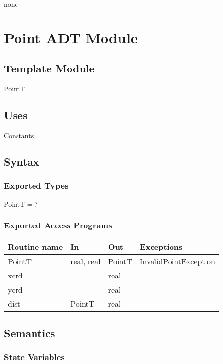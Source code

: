 \documentclass[12pt]{article}
\begin{document}
none

\newpage

\section* {Point ADT Module}

\subsection*{Template Module}

PointT

\subsection* {Uses}

Constants

\subsection* {Syntax}

\subsubsection* {Exported Types}

PointT = ?

\subsubsection* {Exported Access Programs}

\begin{tabular}{| l | l | l | l |}
\hline
\textbf{Routine name} & \textbf{In} & \textbf{Out} & \textbf{Exceptions}\\
\hline
PointT & real, real & PointT & InvalidPointException\\
\hline
xcrd & ~ & real & ~\\
\hline
ycrd & ~ & real & ~\\
\hline
dist & PointT & real & ~\\
\hline
\end{tabular}

\subsection* {Semantics}

\subsubsection* {State Variables}
\end{document}
